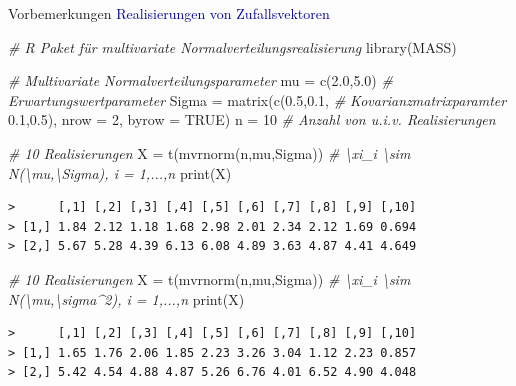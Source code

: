 \documentclass[
  8pt,
  ignorenonframetext,
]{beamer}
\newenvironment{Shaded}{\begin{snugshade}}{\end{snugshade}}
\newcommand{\AttributeTok}[1]{\textcolor[rgb]{0.77,0.63,0.00}{#1}}
\newcommand{\CommentTok}[1]{\textcolor[rgb]{0.56,0.35,0.01}{\textit{#1}}}
\newcommand{\ConstantTok}[1]{\textcolor[rgb]{0.00,0.00,0.00}{#1}}
\newcommand{\DecValTok}[1]{\textcolor[rgb]{0.00,0.00,0.81}{#1}}
\newcommand{\FloatTok}[1]{\textcolor[rgb]{0.00,0.00,0.81}{#1}}
\newcommand{\FunctionTok}[1]{\textcolor[rgb]{0.00,0.00,0.00}{#1}}
\newcommand{\NormalTok}[1]{#1}
\newcommand{\OtherTok}[1]{\textcolor[rgb]{0.56,0.35,0.01}{#1}}
\begin{document}
\begin{frame}[fragile]{Vorbemerkungen}
\protect\hypertarget{vorbemerkungen-4}{}
\textcolor{darkblue}{Realisierungen von Zufallsvektoren} \footnotesize
{} \vspace{1mm}

\begin{Shaded}
\begin{Highlighting}[]
\CommentTok{\# R Paket für multivariate Normalverteilungsrealisierung}
\FunctionTok{library}\NormalTok{(MASS)}

\CommentTok{\# Multivariate Normalverteilungsparameter}
\NormalTok{mu      }\OtherTok{=} \FunctionTok{c}\NormalTok{(}\FloatTok{2.0}\NormalTok{,}\FloatTok{5.0}\NormalTok{)                 }\CommentTok{\# Erwartungswertparameter}
\NormalTok{Sigma   }\OtherTok{=} \FunctionTok{matrix}\NormalTok{(}\FunctionTok{c}\NormalTok{(}\FloatTok{0.5}\NormalTok{,}\FloatTok{0.1}\NormalTok{,          }\CommentTok{\# Kovarianzmatrixparamter}
                   \FloatTok{0.1}\NormalTok{,}\FloatTok{0.5}\NormalTok{),}
                 \AttributeTok{nrow =} \DecValTok{2}\NormalTok{,}
                 \AttributeTok{byrow =} \ConstantTok{TRUE}\NormalTok{)}
\NormalTok{n       }\OtherTok{=} \DecValTok{10}                         \CommentTok{\# Anzahl von u.i.v. Realisierungen}

\CommentTok{\# 10 Realisierungen}
\NormalTok{X       }\OtherTok{=} \FunctionTok{t}\NormalTok{(}\FunctionTok{mvrnorm}\NormalTok{(n,mu,Sigma))     }\CommentTok{\# \textbackslash{}xi\_i \textbackslash{}sim N(\textbackslash{}mu,\textbackslash{}Sigma), i = 1,...,n}
\FunctionTok{print}\NormalTok{(X)}
\end{Highlighting}
\end{Shaded}

\begin{verbatim}
>      [,1] [,2] [,3] [,4] [,5] [,6] [,7] [,8] [,9] [,10]
> [1,] 1.84 2.12 1.18 1.68 2.98 2.01 2.34 2.12 1.69 0.694
> [2,] 5.67 5.28 4.39 6.13 6.08 4.89 3.63 4.87 4.41 4.649
\end{verbatim}

\begin{Shaded}
\begin{Highlighting}[]
\CommentTok{\# 10 Realisierungen}
\NormalTok{X       }\OtherTok{=} \FunctionTok{t}\NormalTok{(}\FunctionTok{mvrnorm}\NormalTok{(n,mu,Sigma))     }\CommentTok{\# \textbackslash{}xi\_i \textbackslash{}sim N(\textbackslash{}mu,\textbackslash{}sigma\^{}2), i = 1,...,n}
\FunctionTok{print}\NormalTok{(X)}
\end{Highlighting}
\end{Shaded}

\begin{verbatim}
>      [,1] [,2] [,3] [,4] [,5] [,6] [,7] [,8] [,9] [,10]
> [1,] 1.65 1.76 2.06 1.85 2.23 3.26 3.04 1.12 2.23 0.857
> [2,] 5.42 4.54 4.88 4.87 5.26 6.76 4.01 6.52 4.90 4.048
\end{verbatim}
\end{frame}
\end{document}
